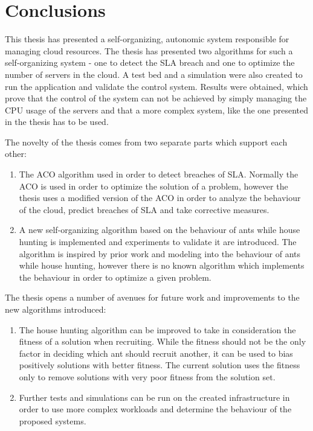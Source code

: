 \chapter{Conclusions} %
\label{Chapter_conclusion}

This thesis has presented a self-organizing, autonomic system responsible for managing cloud resources. The thesis has presented two algorithms for such a self-organizing system - one to detect the SLA breach and one to optimize the number of servers in the cloud. A test bed and a simulation were also created to run the application and validate the control system. Results were obtained, which prove that the control of the system can not be achieved by simply managing the CPU usage of the servers and that a more complex system, like the one presented in the thesis has to be used.

The novelty of the thesis comes from two separate parts which support each other:

\begin{enumerate}
	\item The ACO algorithm used in order to detect breaches of SLA. Normally the ACO is used in order to optimize the solution of a problem, however the thesis uses a modified version of the ACO in order to analyze the behaviour of the cloud, predict breaches of SLA and take corrective measures.
	\item A new self-organizing algorithm based on the behaviour of ants while house hunting is implemented and experiments to validate it are introduced. The algorithm is inspired by prior work and modeling into the behaviour of ants while house hunting, however there is no known algorithm which implements the behaviour in order to optimize a given problem.
\end{enumerate}

The thesis opens a number of avenues for future work and improvements to the new algorithms introduced:

\begin{enumerate}
	\item The house hunting algorithm can be improved to take in consideration the fitness of a solution when recruiting. While the fitness should not be the only factor in deciding which ant should recruit another, it can be used to bias positively solutions with better fitness. The current solution uses the fitness only to remove solutions with very poor fitness from the solution set.
	\item Further tests and simulations can be run on the created infrastructure in order to use more complex workloads and determine the behaviour of the proposed systems.
\end{enumerate}
